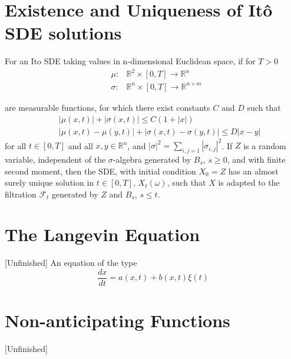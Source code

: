 \documentclass[12pt]{book}
\begin{document}
\section{Existence and Uniqueness of It\^{o} SDE solutions}\label{section:existenceAndUniqueness}
For an Ito SDE taking values in n-dimensional Euclidean space, if for $T>0$\\
\begin{eqnarray*}
&\mu:   &\mathbb{R}^2\times[0,T]\rightarrow \mathbb{R}^n\\
&\sigma:&\mathbb{R}^n \times[0,T] \rightarrow \mathbb{R}^{n\times m}
\end{eqnarray*}

are measurable functions, for which there exist constants $C$ and $D$ such that 
\begin{eqnarray*}
& &|\mu(x,t)|+|\sigma(x,t)|\leq C(1+|x|)\\
& &|\mu(x,t)-\mu(y,t)|+|\sigma(x,t)-\sigma(y,t)|\leq D|x-y|
\end{eqnarray*}
for all $t\in [0,T]$ and all $x,y\in \mathbb{R}^n$, and $|\sigma|^2=\sum_{i,j=1}|\sigma_{i,j}|^2$. 
If $Z$ is a random variable, independent of the $\sigma$-algebra generated by $B_s$, $s\geq 0$, and with finite second moment, then the SDE, with initial condition $X_0=Z$ has an almost surely unique solution in $t\in[0,T]$, $X_t(\omega)$, such that $X$ is adapted to the filtration $\mathcal{F}_t$ generated by $Z$ and $B_s$, $s\leq t$.

\section{The Langevin Equation}\label{section:theLangevinEquation}
[Unfinished]
An equation of the type 
\begin{equation*}
\frac{dx}{dt}=a(x,t)+b(x,t)\xi(t)
\end{equation*}


 
\section{Non-anticipating Functions}
{[Unfinished]}
\end{document}
